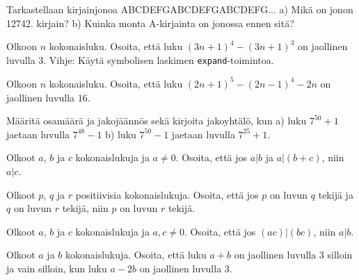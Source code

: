 \begin{kotitehtavasivu}
\begin{tehtava}
	Tarkastellaan kirjainjonoa ABCDEFGABCDEFGABCDEFG... a) Mikä on jonon 12742. kirjain? b) Kuinka monta A-kirjainta on jonossa ennen sitä?
\end{tehtava}

\begin{tehtava}
\end{tehtava}

\begin{tehtava}
	Olkoon $n$ kokonaisluku. Osoita, että luku $(3n+1)^4 - (3n+1)^3$ on jaollinen luvulla 3. Vihje: Käytä symbolisen laskimen {\tt expand}-toimintoa.
\end{tehtava}

\begin{tehtava}
	Olkoon $n$ kokonaisluku. Osoita, että luku $(2n+1)^5 - (2n-1)^4-2n$ on jaollinen luvulla $16$.
\end{tehtava}

\begin{tehtava}
	Määritä osamäärä ja jakojäännös sekä kirjoita jakoyhtälö, kun a) luku $7^{50} + 1$ jaetaan luvulla $7^{48} - 1$ b) luku $7^{50} - 1$ jaetaan luvulla $7^{25} + 1$.
\end{tehtava}

\begin{tehtava}
	Olkoot $a$, $b$ ja $c$ kokonaislukuja ja $a \neq 0$. Osoita, että jos $a|b$ ja $a|(b + c)$, niin $a|c$.
\end{tehtava}

\begin{tehtava}
	Olkoot $p$, $q$ ja $r$ positiivisia kokonaislukuja. Osoita, että jos $p$ on luvun $q$ tekijä ja $q$ on luvun $r$ tekijä, niin $p$ on luvun $r$ tekijä.
\end{tehtava}

\begin{tehtava}
	Olkoot $a$, $b$ ja $c$ kokonaislukuja ja $a, c \neq 0$. Osoita, että jos $(ac)|(bc)$, niin $a|b$.
\end{tehtava}

\begin{tehtava}
	Olkoot $a$ ja $b$ kokonaislukuja. Osoita, että luku $a + b$ on jaollinen luvulla $3$ silloin ja vain silloin, kun luku $a - 2b$ on jaollinen luvulla $3$.
\end{tehtava}


\end{kotitehtavasivu}
